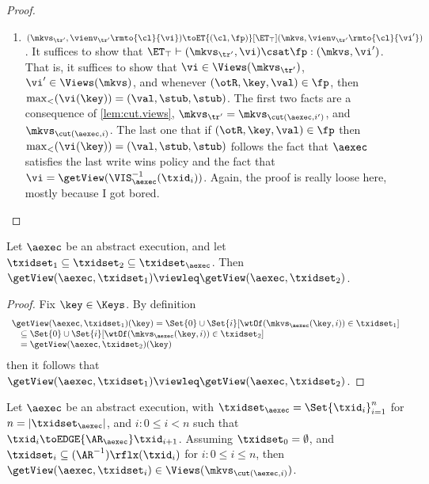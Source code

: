 \begin{proof}
\begin{itemize}
\begin{enumerate}
\item $(\mkvs_{\tr'}, \vienv_{\tr'}\rmto{\cl}{\vi}) \toET{(\cl, \fp)}[\ET_{\top}] (\mkvs,  \vienv_{\tr'}\rmto{\cl}{\vi'})$. 
    It suffices to show that $\ET_{\top} \vdash (\mkvs_{\tr'}, \vi) \csat \fp: (\mkvs,\vi')$. 
That is, it suffices to show that $\vi \in \Views(\mkvs_{\tr'})$, $\vi' \in \Views(\mkvs)$, 
and whenever $(\otR, \key, \val) \in \fp$, then $\max_{<}(\vi(\key)) = (\val, \stub, \stub)$. 
The first two facts are a consequence of \cref{lem:cut.views}, $\mkvs_{\tr'} = \mkvs_{\cut(\aexec, i')}$, and  $\mkvs_{\cut(\aexec, i)}$. 
The last one that if $(\otR, \key, \val) \in \fp$ then $\max_{<}(\vi(\key)) = (\val, \stub, \stub)$ follows the fact that 
$\aexec$ satisfies the last write wins policy and the fact that $\vi = \getView(\VIS^{-1}_{\aexec}(\txid_{i}))$.
\ac{Again, the proof is really loose here, mostly because I got bored.}
\end{enumerate} 

\end{itemize}
\end{proof}

\begin{lemma}
\label{lem:getView.monotone}
Let $\aexec$ be an abstract execution, and let $\txidset_1 \subseteq \txidset_2 \subseteq \txidset_{\aexec}$. 
Then $\getView(\aexec, \txidset_1) \viewleq \getView(\aexec, \txidset_2)$.
\end{lemma}
\begin{proof}
Fix $\key \in \Keys$. By definition  
\[
\begin{array}{l}
    \getView(\aexec, \txidset_1)(\key) = \Set{0} \cup \Set{i}[\wtOf(\mkvs_{\aexec}(\key, i)) \in \txidset_1] \\
    \quad \subseteq \Set{0} \cup \Set{i}[\wtOf(\mkvs_{\aexec}(\key, i)) \in \txidset_2] \\
\quad = \getView(\aexec, \txidset_2)(\key)
\end{array}
\]
then it follows that  $\getView(\aexec, \txidset_1) \viewleq \getView(\aexec, \txidset_2)$.
\end{proof}

\begin{lemma}
\label{lem:cut.views}
Let $\aexec$ be an abstract execution, with $\txidset_{\aexec} = \Set{\txid_{i}}_{i = 1}^{n}$ for 
$n = \lvert \txidset_{\aexec} \rvert$, and \( i : 0 \leq i < n\) such that $\txid_{i} \toEDGE{\AR_{\aexec}} \txid_{i+1}$.
Assuming $\txidset_{0} = \emptyset$, and $\txidset_{i} \subseteq (\AR^{-1})\rflx(\txid_{i})$ for $i : 0 \leq i \leq n$,
then $\getView(\aexec, \txidset_{i}) \in \Views(\mkvs_{\cut(\aexec, i)})$.
\end{lemma}

